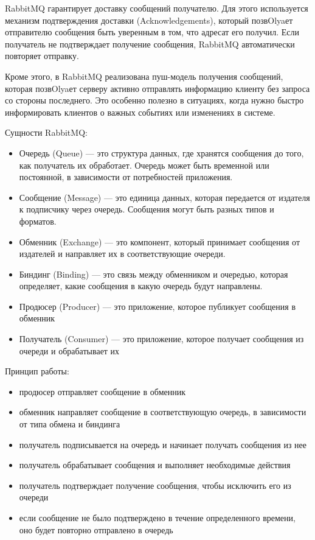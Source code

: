 \documentclass[areasetadvanced]{scrartcl}
\begin{document}
RabbitMQ гарантирует доставку сообщений получателю. Для этого используется механизм подтверждения доставки (Acknowledgements), который позвOlyaет отправителю сообщения быть уверенным в том, что адресат его получил. Если получатель не подтверждает получение сообщения, RabbitMQ автоматически повторяет отправку.

Кроме этого, в RabbitMQ реализована пуш-модель получения сообщений, которая позвOlyaет серверу активно отправлять информацию клиенту без запроса со стороны последнего. Это особенно полезно в ситуациях, когда нужно быстро информировать клиентов о важных событиях или изменениях в системе.

Сущности RabbitMQ:
\begin{itemize}
	\item Очередь (Queue) — это структура данных, где хранятся сообщения до того, как получатель их обработает. Очередь может быть временной или постоянной, в зависимости от потребностей приложения.
	\item Сообщение (Message) — это единица данных, которая передается от издателя к подписчику через очередь. Сообщения могут быть разных типов и форматов.
	\item Обменник (Exchange) — это компонент, который принимает сообщения от издателей и направляет их в соответствующие очереди.
	\item Биндинг (Binding) — это связь между обменником и очередью, которая определяет, какие сообщения в какую очередь будут направлены.
	\item Продюсер (Producer) — это приложение, которое публикует сообщения в обменник
	\item Получатель (Consumer) — это приложение, которое получает сообщения из очереди и обрабатывает их
\end{itemize}

Принцип работы:
\begin{itemize}
	\item продюсер отправляет сообщение в обменник
	\item обменник направляет сообщение в соответствующую очередь, в зависимости от типа обмена и биндинга
	\item получатель подписывается на очередь и начинает получать сообщения из нее
	\item получатель обрабатывает сообщения и выполняет необходимые действия
	\item получатель подтверждает получение сообщения, чтобы исключить его из очереди
	\item если сообщение не было подтверждено в течение определенного времени, оно будет повторно отправлено в очередь
\end{itemize}
\end{document}
